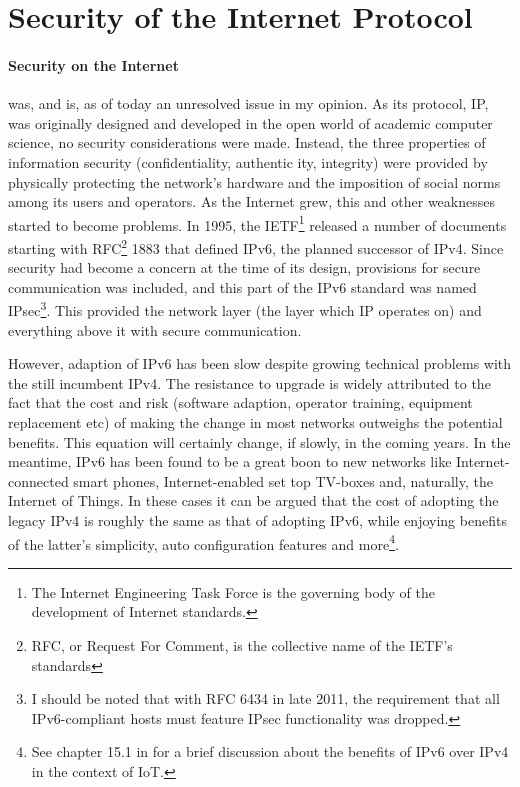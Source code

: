 \documentclass[final,a4paper,twoside,11pt,onecolumn]{report}
\begin{document}
\section{Security of the Internet Protocol}
\paragraph{Security on the Internet} was, and is, as of today an unresolved issue in my opinion. As its protocol, IP, was originally designed and developed in the open world of academic computer science, no security considerations were made. Instead, the three properties of information security (confidentiality, authentic ity, integrity) \citep[section 8.1]{vasseur10interconnecting} were provided by physically protecting the network's hardware and the imposition of social norms among its users and operators. As the Internet grew, this and other weaknesses started to become problems. In 1995, the IETF\footnote{The Internet Engineering Task Force is the governing body of the development of Internet standards.} released a number of documents starting with RFC\footnote{RFC, or Request For Comment, is the collective name of the IETF's standards} 1883\cite{rfc1883} that defined IPv6, the planned successor of IPv4. Since security had become a concern at the time of its design, provisions for secure communication was included, and this part of the IPv6 standard was named IPsec\footnote{I should be noted that with RFC 6434\cite{rfc6434} in late 2011, the requirement that all IPv6-compliant hosts must feature IPsec functionality was dropped.}. This provided the network layer (the layer which IP operates on) and everything above it with secure communication.


However, adaption of IPv6 has been slow despite growing technical problems with the still incumbent IPv4. The resistance to upgrade is widely attributed to the fact that the cost and risk (software adaption, operator training, equipment replacement etc) of making the change in most networks outweighs the potential benefits. This equation will certainly change, if slowly, in the coming years. In the meantime, IPv6 has been found to be a great boon to new networks like Internet-connected smart phones, Internet-enabled set top TV-boxes and, naturally, the Internet of Things. In these cases it can be argued that the cost of adopting the legacy IPv4 is roughly the same as that of adopting IPv6, while enjoying benefits of the latter's simplicity, auto configuration features and more\footnote{See chapter 15.1 in \cite{vasseur10interconnecting} for a brief discussion about the benefits of IPv6 over IPv4 in the context of IoT.}.
\end{document}
